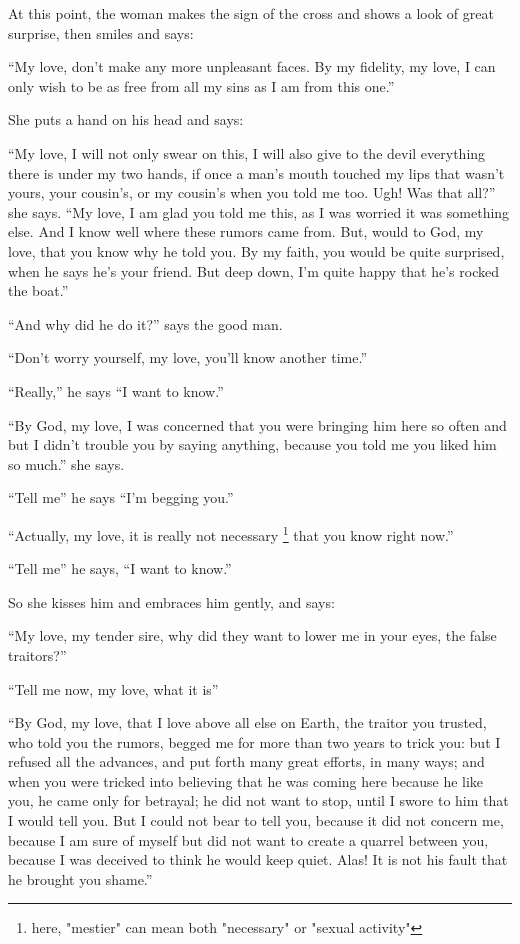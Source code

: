 \documentclass{book}
\begin{document}
At this point, the woman makes the sign of the cross and shows a look of great surprise, then smiles and says:

``My love, don't make any more unpleasant faces. By my fidelity, my love, I can only wish to be as free from all my sins as I am from this one.''

She puts a hand on his head and says:

``My love, I will not only swear on this, I will also give to the devil everything there is under my two hands, if once a man's mouth touched my lips that wasn't yours, your cousin's, or my cousin's when you told me too. Ugh! Was that all?'' she says. ``My love, I am glad you told me this, as I was worried it was something else. And I know well where these rumors came from. But, would to God, my love, that you know why he told you. By my faith, you would be quite surprised, when he says he's your friend. But deep down, I'm quite happy that he's rocked the boat.''

``And why did he do it?'' says the good man.

``Don't worry yourself, my love, you'll know another time.''

``Really,'' he says ``I want to know.''

``By God, my love, I was concerned that you were bringing him here so often and but I didn't trouble you by saying anything, because you told me you liked him so much.'' she says.

``Tell me'' he says ``I'm begging you.''

``Actually, my love, it is really not necessary
\footnote{here, "mestier" can mean both "necessary" or "sexual activity"}
 that you know right now.''

``Tell me'' he says, ``I want to know.''

So she kisses him and embraces him gently, and says:

``My love, my tender sire, why did they want to lower me in your eyes, the false traitors?''

``Tell me now, my love, what it is''

``By God, my love, that I love above all else on Earth, the traitor you trusted, who told you the rumors, begged me for more than two years to trick you: but I refused all the advances, and put forth many great efforts, in many ways; and when you were tricked into believing that he was coming here because he like you, he came only for betrayal; he did not want to stop, until I swore to him that I would tell you. But I could not bear to tell you, because it did not concern me, because I am sure of myself but did not want to create a quarrel between you, because I was deceived to think he would keep quiet. Alas! It is not his fault that he brought you shame.''
\end{document}
